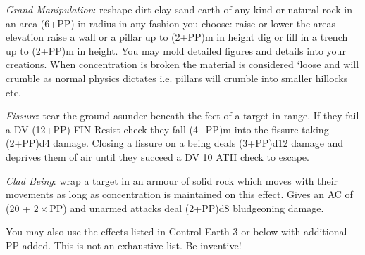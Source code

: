 \begin{multicols}{3}
{\begin{spellitemize}
\item {\it Grand Manipulation}: reshape dirt\comma{} clay\comma{} sand\comma{} earth of any kind\comma{} or natural rock in an area (6+PP) in radius in any fashion you choose: raise or lower the area\apos{}s elevation\comma{} raise a wall or a pillar up to (2+PP)m in height\comma{} dig or fill in a trench up to (2+PP)m in height. You may mold detailed figures and details into your creations. When concentration is broken\comma{} the material is considered `loose\apos{}\comma{} and will crumble as normal physics dictates\comma{} i.e. pillars will crumble into smaller hillocks etc. 
\item {\it Fissure}: tear the ground asunder beneath the feet of a target in range. If they fail a DV (12+PP) FIN Resist check\comma{} they fall (4+PP)m into the fissure\comma{} taking (2+PP)d4 damage. Closing a fissure on a being deals (3+PP)d12 damage and deprives them of air until they succeed a DV 10 ATH check to escape.
\item {\it Clad Being}: wrap a target in an armour of solid rock\comma{} which moves with their movements as long as concentration is maintained on this effect. Gives an AC of (20 + $2\times$PP)\comma{} and unarmed attacks deal (2+PP)d8 bludgeoning damage. 
\end{spellitemize}
You may also use the effects listed in Control Earth 3 or below with \PPDifference{\DVExpF}{\DVAdpF} additional PP added. 
This is not an exhaustive list. Be inventive!}
\end{multicols}
